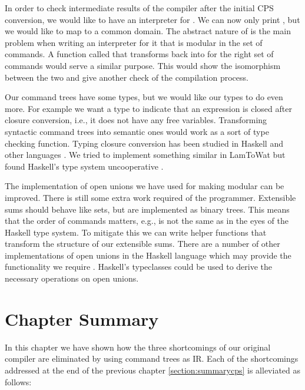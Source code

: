 In order to check intermediate results of the compiler after the initial CPS conversion, we would like to have an interpreter for . We can now only print , but we would like to map  to a common domain. The abstract nature of  is the main problem when writing an interpreter for it that is modular in the set of commands. A function called  that transforms  back into  for the right set of commands would serve a similar purpose. This would show the isomorphism between the two and give another check of the compilation process.

Our command trees have some types, but we would like our types to do even more. For example we want a type to indicate that an expression is closed after closure conversion, i.e., it does not have any free variables. Transforming syntactic command trees into semantic ones would work as a sort of type checking function. Typing closure conversion has been studied in Haskell and other languages \autocite{DBLP:conf/haskell/GuillemetteM07, DBLP:conf/pldi/Chlipala07, DBLP:conf/popl/MorrisettWCG98}. We tried to implement something similar in LamToWat but found Haskell's type system uncooperative \autocite{10.1145/2578854.2503786}.

The implementation of open unions we have used for making  modular can be improved. There is still some extra work required of the programmer. Extensible sums should behave like sets, but are implemented as binary trees. This means that the order of commands matters, e.g.,  is not the same as  in the eyes of the Haskell type system. To mitigate this we can write helper functions that transform the structure of our extensible sums. There are a number of other implementations of open unions in the Haskell language which may provide the functionality we require \autocite{extensible-effects, open-union}. Haskell's typeclasses could be used to derive the necessary operations on open unions.

\section{\label{section:summarytree}Chapter Summary}
In this chapter we have shown how the three shortcomings of our original compiler are eliminated by using command trees as IR. Each of the shortcomings addressed at the end of the previous chapter \ref{section:summarycps} is alleviated as follows: 

